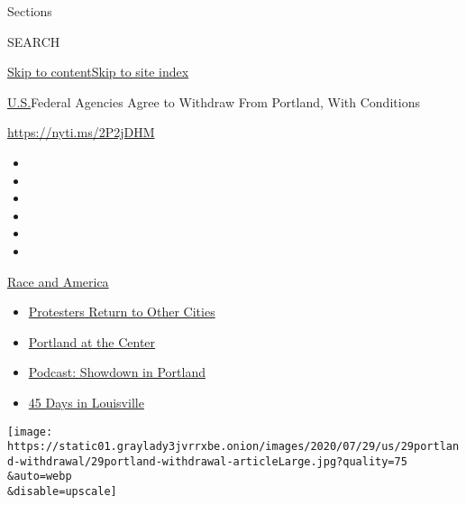Sections

SEARCH

\protect\hyperlink{site-content}{Skip to
content}\protect\hyperlink{site-index}{Skip to site index}

\href{/section/us}{U.S.}\textbar{}Federal Agencies Agree to Withdraw
From Portland, With Conditions

\href{https://nyti.ms/2P2jDHM}{https://nyti.ms/2P2jDHM}

\begin{itemize}
\item
\item
\item
\item
\item
\item
\end{itemize}

\href{https://www.nytimes3xbfgragh.onion/news-event/george-floyd-protests-minneapolis-new-york-los-angeles?action=click\&pgtype=Article\&state=default\&region=TOP_BANNER\&context=storylines_menu}{Race
and America}

\begin{itemize}
\tightlist
\item
  \href{https://www.nytimes3xbfgragh.onion/2020/07/26/us/protests-portland-seattle-trump.html?action=click\&pgtype=Article\&state=default\&region=TOP_BANNER\&context=storylines_menu}{Protesters
  Return to Other Cities}
\item
  \href{https://www.nytimes3xbfgragh.onion/2020/07/24/us/portland-oregon-protests-white-race.html?action=click\&pgtype=Article\&state=default\&region=TOP_BANNER\&context=storylines_menu}{Portland
  at the Center}
\item
  \href{https://www.nytimes3xbfgragh.onion/2020/07/23/podcasts/the-daily/portland-protests.html?action=click\&pgtype=Article\&state=default\&region=TOP_BANNER\&context=storylines_menu}{Podcast:
  Showdown in Portland}
\item
  \href{https://www.nytimes3xbfgragh.onion/interactive/2020/07/16/us/black-lives-matter-protests-louisville-breonna-taylor.html?action=click\&pgtype=Article\&state=default\&region=TOP_BANNER\&context=storylines_menu}{45
  Days in Louisville}
\end{itemize}

\texttt{[image: https://static01.graylady3jvrrxbe.onion/images/2020/07/29/us/29portland-withdrawal/29portland-withdrawal-articleLarge.jpg?quality=75\\\&auto=webp\\\&disable=upscale]}

